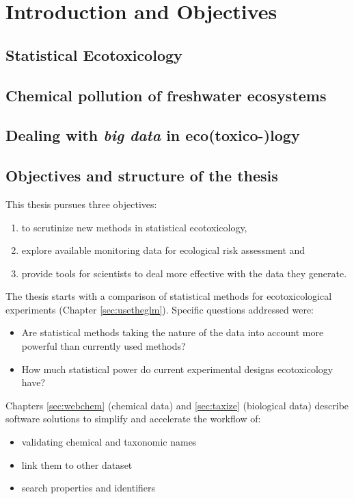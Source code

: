 \chapter{Introduction and Objectives}
\label{sec:introduction} 

\section{Statistical Ecotoxicology}

\section{Chemical pollution of freshwater ecosystems}

\section{Dealing with \emph{big data} in eco(toxico-)logy}




\section{Objectives and structure of the thesis}

This thesis pursues three objectives: 
\begin{enumerate}[i]
	\item to scrutinize new methods in statistical ecotoxicology,
	\item explore available monitoring data for ecological risk assessment and
	\item provide tools for scientists to deal more effective with the data they generate.
\end{enumerate}


The thesis starts with a comparison of statistical methods for ecotoxicological experiments (Chapter \ref{sec:usetheglm}). 
Specific questions addressed were:

\begin{itemize}
	\item Are statistical methods taking the nature of the data into account more powerful than currently used methods?
	\item How much statistical power do current experimental designs ecotoxicology have?
\end{itemize}








Chapters \ref{sec:webchem} (chemical data) and \ref{sec:taxize} (biological data) describe software solutions to simplify and accelerate the workflow of:

\begin{itemize}
	\item validating chemical and taxonomic names
	\item link them to other dataset
	\item search properties and identifiers
\end{itemize}
